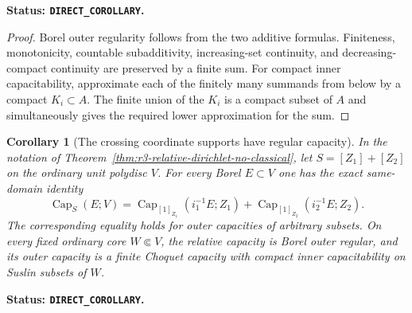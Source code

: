 \documentclass[11pt,a4paper]{article}
\numberwithin{equation}{section}
\newtheorem{corollary}[theorem]{Corollary}
\theoremstyle{definition}
\theoremstyle{remark}
\begin{document}
\noindent\textbf{Status: \texttt{DIRECT\_COROLLARY}.}

\begin{proof}
Borel outer regularity follows from the two additive formulas.
Finiteness, monotonicity, countable subadditivity, increasing-set
continuity, and decreasing-compact continuity are preserved by a
finite sum.  For compact inner capacitability, approximate each of
the finitely many summands from below by a compact $K_i\subset A$.
The finite union of the $K_i$ is a compact subset of $A$ and
simultaneously gives the required lower approximation for the sum.
\end{proof}

\begin{corollary}[The crossing coordinate supports have regular capacity]
\label{cor:r3-crossing-support-capacity}
In the notation of
Theorem~\ref{thm:r3-relative-dirichlet-no-classical}, let
$S=[Z_1]+[Z_2]$ on the ordinary unit polydisc $V$.  For every Borel
$E\subset V$ one has the exact same-domain identity
\begin{equation}
 \operatorname{Cap}_S(E;V)
   =\operatorname{Cap}_{[1]_{Z_1}}(i_1^{-1}E;Z_1)
     +\operatorname{Cap}_{[1]_{Z_2}}(i_2^{-1}E;Z_2).
 \label{eq:r3-crossing-capacity-sum}
\end{equation}
The corresponding equality holds for outer capacities of arbitrary
subsets.  On every fixed ordinary core $W\Subset V$, the relative
capacity is Borel outer regular, and its outer capacity is a finite
Choquet capacity with compact inner capacitability on Suslin subsets
of $W$.
\end{corollary}

\noindent\textbf{Status: \texttt{DIRECT\_COROLLARY}.}
\end{document}
